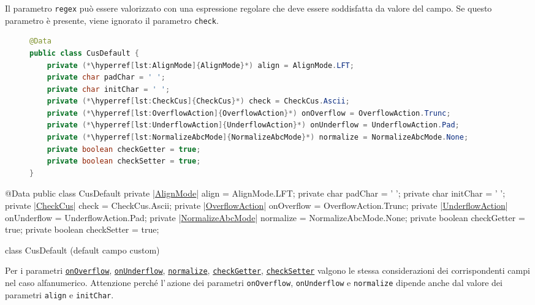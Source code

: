 Il parametro \verb!regex! può essere valorizzato con una espressione regolare
che deve essere soddisfatta da valore del campo. Se questo parametro è presente,
viene ignorato il parametro \verb!check!.

\ifesource
\begin{figure*}[!htb]
\begin{lstlisting}[language=java, 
caption=class CusDefault (default campo custom), 
label=lst:CusDefault]
@Data
public class CusDefault {
    private (*\hyperref[lst:AlignMode]{AlignMode}*) align = AlignMode.LFT;
    private char padChar = ' ';
    private char initChar = ' ';
    private (*\hyperref[lst:CheckCus]{CheckCus}*) check = CheckCus.Ascii;
    private (*\hyperref[lst:OverflowAction]{OverflowAction}*) onOverflow = OverflowAction.Trunc;
    private (*\hyperref[lst:UnderflowAction]{UnderflowAction}*) onUnderflow = UnderflowAction.Pad;
    private (*\hyperref[lst:NormalizeAbcMode]{NormalizeAbcMode}*) normalize = NormalizeAbcMode.None;
    private boolean checkGetter = true;
    private boolean checkSetter = true;
}
\end{lstlisting}
\end{figure*}
\else
\begin{elisting}[!htb]
\begin{javacode}
@Data
public class CusDefault {
    private |\hyperref[lst:AlignMode]{AlignMode}| align = AlignMode.LFT;
    private char padChar = ' ';
    private char initChar = ' ';
    private |\hyperref[lst:CheckCus]{CheckCus}| check = CheckCus.Ascii;
    private |\hyperref[lst:OverflowAction]{OverflowAction}| onOverflow = OverflowAction.Trunc;
    private |\hyperref[lst:UnderflowAction]{UnderflowAction}| onUnderflow = UnderflowAction.Pad;
    private |\hyperref[lst:NormalizeAbcMode]{NormalizeAbcMode}| normalize = NormalizeAbcMode.None;
    private boolean checkGetter = true;
    private boolean checkSetter = true;
}
\end{javacode}
\caption{class CusDefault (default campo custom)}
\label{lst:CusDefault}
\end{elisting}
\fi

Per i parametri \hyperlink{abc:ovf}{\texttt{onOverflow}}, 
\hyperlink{abc:unf}{\texttt{onUnderflow}}, 
\hyperlink{abc:nrm}{\texttt{normalize}},
\hyperlink{abc:get}{\texttt{checkGetter}},
\hyperlink{abc:get}{\texttt{checkSetter}} valgono le stessa considerazioni dei 
corrispondenti campi nel caso alfanumerico. Attenzione perché l'\,azione 
dei parametri \texttt{onOver\-flow}, \verb!onUnderflow! e \verb!normalize! 
dipende anche dal valore dei parametri \verb!align! e \verb!initChar!.

